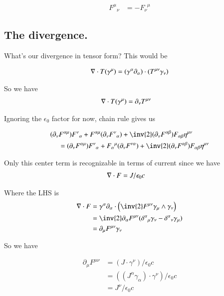 \begin{align*}
{F^{\mu}}_{\nu} &= -{F_{\nu}}^{\mu}
\end{align*}

\subsection{The divergence. }

What's our divergence in tensor form?  This would be

\begin{align*}
\nabla \cdot T(\gamma^\mu)
&= (\gamma^\alpha \partial_\alpha ) \cdot (T^{\mu\nu} \gamma_\nu) \\
\end{align*}

So we have
\begin{align}
\nabla \cdot T(\gamma^\mu)
&= \partial_\nu T^{\mu\nu}
\end{align}

Ignoring the $\epsilon_0$ factor for now, chain rule gives us

\begin{align*}
(\partial_\nu &F^{\alpha\mu}) {F^{\nu}}_{\alpha} + 
F^{\alpha\mu} (\partial_\nu {F^{\nu}}_{\alpha}) + 
\inv{2} (\partial_\nu F^{\alpha\beta}) F_{\alpha\beta} \eta^{\mu\nu} \\
&=
(\partial_\nu F^{\alpha\mu}) {F^{\nu}}_{\alpha} + 
{F_{\alpha}}^{\mu} 
(\partial_\nu F^{\nu\alpha}) + 
\inv{2} (\partial_\nu F^{\alpha\beta}) F_{\alpha\beta} \eta^{\mu\nu} 
\end{align*}

Only this center term is recognizable in terms of current since we
have
\begin{align*}
\nabla \cdot F &= J/\epsilon_0 c
\end{align*}

Where the LHS is
\begin{align*}
\grad \cdot F 
&= \gamma^\alpha \partial_\alpha \cdot \left( \inv{2} F^{\mu\nu} \gamma_\mu \wedge \gamma_\nu \right) \\
&= \inv{2} \partial_\alpha F^{\mu\nu} ( {\delta^\alpha}_\mu \gamma_\nu -{\delta^\alpha}_\nu \gamma_\mu ) \\
&= \partial_\mu F^{\mu\nu} \gamma_\nu
\end{align*}

So we have

\begin{align*}
\partial_\mu F^{\mu\nu} 
&= (J \cdot \gamma^\nu)/\epsilon_0 c \\
&= ((J^\alpha \gamma_\alpha) \cdot \gamma^\nu)/\epsilon_0 c \\
&= J^\nu/\epsilon_0 c
\end{align*}


